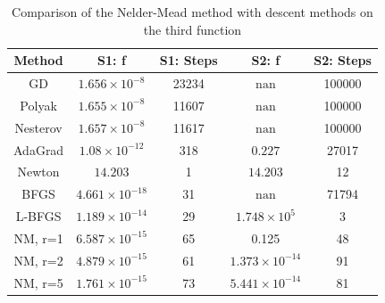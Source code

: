 \documentclass[9pt]{IEEEtran}
\begin{document}
\begin{table}[h]
    \centering
    \begin{tabular}{|c|c|c|c|c|}
        \hline
        \textbf{Method} & \textbf{S1: f} & \textbf{S1: Steps} & \textbf{S2: f} & \textbf{S2: Steps} \\ \hline
        GD       & $1.656\times10^{-8}$  & 23234  & $\text{nan}$          & 100000 \\ \hline
        Polyak   & $1.655\times10^{-8}$  & 11607  & $\text{nan}$          & 100000 \\ \hline
        Nesterov & $1.657\times10^{-8}$  & 11617  & $\text{nan}$          & 100000 \\ \hline
        AdaGrad  & $1.08\times10^{-12}$ & 318    & $0.227$            & 27017  \\ \hline
        Newton   & $14.203$             & 1      & $14.203$           & 12     \\ \hline
        BFGS     & $4.661\times10^{-18}$ & 31     & $\text{nan}$          & 71794  \\ \hline
        L-BFGS   & $1.189\times10^{-14}$ & 29     & $1.748\times10^{5}$ & 3      \\ \hline
        NM, r=1 & $6.587 \times 10^{-15}$  & 65 & 0.125 & 48 \\ \hline
        NM, r=2 & $4.879 \times 10^{-15}$  & 61 & $1.373 \times 10^{-14}$ & 91 \\ \hline
        NM, r=5 & $1.761 \times 10^{-15}$  & 73 & $5.441 \times 10^{-14}$ & 81 \\ \hline
    \end{tabular}
        \caption{Comparison of the Nelder-Mead method with descent methods on the third
    function}
    \label{tab:f3}
\end{table}
\end{document}
